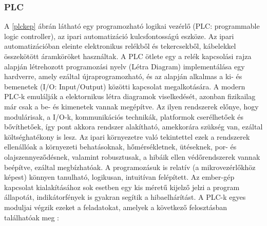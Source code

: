 \subsubsection{PLC}

A \ref{plckep} ábrán látható egy programozható logikai vezérlő (PLC: programmable logic controller), az ipari automatizáció kulcsfontosságú eszköze. Az ipari automatizációban eleinte elektronikus relékből és tekercsekből, kábelekkel összekötött áramköröket használtak. A PLC ötlete egy a relék kapcsolási rajza alapján létrehozott programozási nyelv (Létra Diagram) implementálása egy hardverre, amely ezáltal újraprogramozható, és az alapján alkalmas a ki- és bemenetek (I/O: Input/Output) közötti kapcsolat megalkotására. A modern PLC-k emulálják a elektornikus létra diagramok viselkedését, azonban fizikailag már csak a be- és kimenetek vannak megépítve. Az ilyen rendszerek előnye, hogy modulárisak, a I/O-k, kommunikációs technikák, platformok cserélhetőek és bővíthetőek, így pont akkora rendszer alakítható, amekkorára szükség van, ezáltal költséghatékony is lesz. Az ipari környezetre való tekintettel ezek a rendszerek ellenállóak a környezeti behatásoknak, hőmérsékletnek, ütéseknek, por- és olajszennyeződésnek, valamint robusztusak, a hibáik ellen védőrendszerek vannak beépítve, ezáltal megbízhatóak. A programozásuk is relatív (a mikrovezérlőkhöz képest) könnyen tanulható, logikusan, intuitívan felépített. Az ember-gép kapcsolat kialakításához sok esetben egy kis méretű kijelző jelzi a program állapotát, indikátorfények is gyakran segítik a hibaelhárítást. A PLC-k egyes moduljai végzik ezeket a feladatokat, amelyek a következő felosztásban találhatóak meg \cite{Alphonsus2016}:
